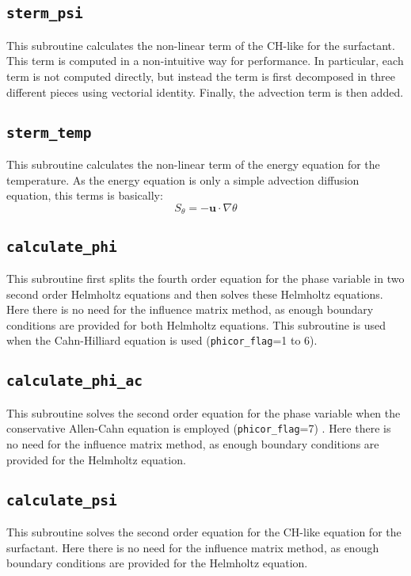 \subsection{\texttt{sterm\_psi}}
This subroutine calculates the non-linear term of the CH-like for the surfactant.
This term is computed in a non-intuitive way for performance.
In particular, each term is not computed directly, but instead the term is first decomposed in three different pieces using vectorial identity.
Finally, the advection term is then added.

\subsection{\texttt{sterm\_temp}}
This subroutine calculates the non-linear term of the energy equation for the temperature.
As the energy equation is only a simple advection diffusion equation, this terms is basically:
\[
S_\theta=-\mathbf{u}\cdot\nabla\theta
\]


\subsection{\texttt{calculate\_phi}}
This subroutine first splits the fourth order equation for the phase variable in two second order Helmholtz equations and then solves these Helmholtz equations. Here there is no need for the influence matrix method, as enough boundary conditions are provided for both Helmholtz equations.
This subroutine is used when the Cahn-Hilliard equation is used (\texttt{phicor\_flag}=1 to 6).

\subsection{\texttt{calculate\_phi\_ac}}
This subroutine solves the second order equation for the phase variable when the conservative Allen-Cahn equation is employed (\texttt{phicor\_flag}=7) . 
Here there is no need for the influence matrix method, as enough boundary conditions are provided for the Helmholtz equation.

\subsection{\texttt{calculate\_psi}}
This subroutine solves the second order equation for the CH-like equation for the surfactant.
Here there is no need for the influence matrix method, as enough boundary conditions are provided for the Helmholtz equation.

